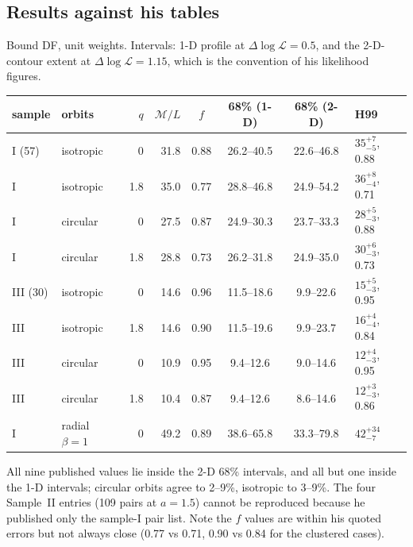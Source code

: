 \documentclass[11pt]{article}
\newcommand{\ML}{\ensuremath{\mathcal{M}/L}}
\begin{document}
\subsection{Results against his tables}
\label{sec:h99results}

Bound DF, unit weights. Intervals: 1-D profile at $\Delta\log\mathcal{L}=0.5$,
and the 2-D-contour extent at $\Delta\log\mathcal{L}=1.15$, which is the
convention of his likelihood figures.

\begin{center}
\begin{tabular}{llrrcccl}
\toprule
sample & orbits & $q$ & \ML & $f$ & 68\% (1-D) & 68\% (2-D) & H99 \\
\midrule
I (57)  & isotropic & 0   & 31.8 & 0.88 & 26.2--40.5 & 22.6--46.8 & $35^{+7}_{-5}$, 0.88 \\
I       & isotropic & 1.8 & 35.0 & 0.77 & 28.8--46.8 & 24.9--54.2 & $36^{+8}_{-4}$, 0.71 \\
I       & circular  & 0   & 27.5 & 0.87 & 24.9--30.3 & 23.7--33.3 & $28^{+5}_{-3}$, 0.88 \\
I       & circular  & 1.8 & 28.8 & 0.73 & 26.2--31.8 & 24.9--35.0 & $30^{+6}_{-3}$, 0.73 \\
III (30) & isotropic & 0  & 14.6 & 0.96 & 11.5--18.6 & 9.9--22.6  & $15^{+5}_{-3}$, 0.95 \\
III     & isotropic & 1.8 & 14.6 & 0.90 & 11.5--19.6 & 9.9--23.7  & $16^{+4}_{-4}$, 0.84 \\
III     & circular  & 0   & 10.9 & 0.95 & 9.4--12.6  & 9.0--14.6  & $12^{+4}_{-3}$, 0.95 \\
III     & circular  & 1.8 & 10.4 & 0.87 & 9.4--12.6  & 8.6--14.6  & $12^{+3}_{-3}$, 0.86 \\
I       & radial $\beta=1$ & 0 & 49.2 & 0.89 & 38.6--65.8 & 33.3--79.8 & $42^{+34}_{-7}$ \\
\bottomrule
\end{tabular}
\end{center}

All nine published values lie inside the 2-D 68\% intervals, and all but one
inside the 1-D intervals; circular orbits agree to 2--9\%, isotropic to
3--9\%. The four Sample~II entries (109 pairs at $a=1.5$) cannot be
reproduced because he published only the sample-I pair list. Note the $f$
values are within his quoted errors but not always close (0.77 vs 0.71, 0.90
vs 0.84 for the clustered cases).
\end{document}
